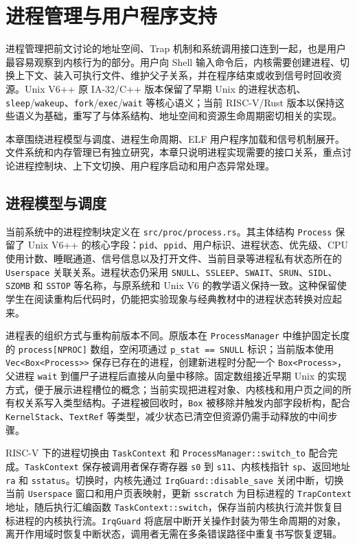 \chapter{进程管理与用户程序支持}\label{chap:proc-user}

进程管理把前文讨论的地址空间、Trap 机制和系统调用接口连到一起，也是用户最容易观察到内核行为的部分。用户向 Shell 输入命令后，内核需要创建进程、切换上下文、装入可执行文件、维护父子关系，并在程序结束或收到信号时回收资源。Unix V6++ 原 IA-32/C++ 版本保留了早期 Unix 的进程状态机、\verb|sleep|/\verb|wakeup|、\verb|fork|/\verb|exec|/\verb|wait| 等核心语义；当前 RISC-V/Rust 版本以保持这些语义为基础，重写了与体系结构、地址空间和资源生命周期密切相关的实现。

本章围绕进程模型与调度、进程生命周期、ELF 用户程序加载和信号机制展开。文件系统和内存管理已有独立研究，本章只说明进程实现需要的接口关系，重点讨论进程控制块、上下文切换、用户程序启动和用户态异常处理。

\section{进程模型与调度}

当前系统中的进程控制块定义在 \verb|src/proc/process.rs|。其主体结构 \verb|Process| 保留了 Unix V6++ 的核心字段：\verb|pid|、\verb|ppid|、用户标识、进程状态、优先级、CPU 使用计数、睡眠通道、信号信息以及打开文件、当前目录等进程私有状态所在的 \verb|Userspace| 关联关系。进程状态仍采用 \verb|SNULL|、\verb|SSLEEP|、\verb|SWAIT|、\verb|SRUN|、\verb|SIDL|、\verb|SZOMB| 和 \verb|SSTOP| 等名称，与原系统和 Unix V6 的教学语义保持一致\cite{arpaci2019ostep,xv6_book_2023}。这种保留使学生在阅读重构后代码时，仍能把实验现象与经典教材中的进程状态转换对应起来。

进程表的组织方式与重构前版本不同。原版本在 \verb|ProcessManager| 中维护固定长度的 \verb|process[NPROC]| 数组，空闲项通过 \verb|p_stat == SNULL| 标识；当前版本使用 \verb|Vec<Box<Process>>| 保存已存在的进程，创建新进程时分配一个 \verb|Box<Process>|，父进程 \verb|wait| 到僵尸子进程后直接从向量中移除。固定数组接近早期 Unix 的实现方式，便于展示进程槽位的概念；当前实现把进程对象、内核栈和用户页之间的所有权关系写入类型结构。子进程被回收时，\verb|Box| 被移除并触发内部字段析构，配合 \verb|KernelStack|、\verb|TextRef| 等类型，减少状态已清空但资源仍需手动释放的中间步骤。

RISC-V 下的进程切换由 \verb|TaskContext| 和 \verb|ProcessManager::switch_to| 配合完成。\verb|TaskContext| 保存被调用者保存寄存器 \verb|s0| 到 \verb|s11|、内核栈指针 \verb|sp|、返回地址 \verb|ra| 和 \verb|sstatus|。切换时，内核先通过 \verb|IrqGuard::disable_save| 关闭中断，切换当前 \verb|Userspace| 窗口和用户页表映射，更新 \verb|sscratch| 为目标进程的 \verb|TrapContext| 地址，随后执行汇编函数 \verb|TaskContext::switch|，保存当前内核执行流并恢复目标进程的内核执行流。\verb|IrqGuard| 将底层中断开关操作封装为带生命周期的对象，离开作用域时恢复中断状态，调用者无需在多条错误路径中重复书写恢复逻辑\cite{rust_reference}。

